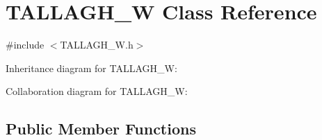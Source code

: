 \hypertarget{class_t_a_l_l_a_g_h___w}{}\section{T\+A\+L\+L\+A\+G\+H\+\_\+W Class Reference}
\label{class_t_a_l_l_a_g_h___w}


{\ttfamily \#include $<$T\+A\+L\+L\+A\+G\+H\+\_\+\+W.\+h$>$}



Inheritance diagram for T\+A\+L\+L\+A\+G\+H\+\_\+W\+:


Collaboration diagram for T\+A\+L\+L\+A\+G\+H\+\_\+W\+:
\subsection*{Public Member Functions}
